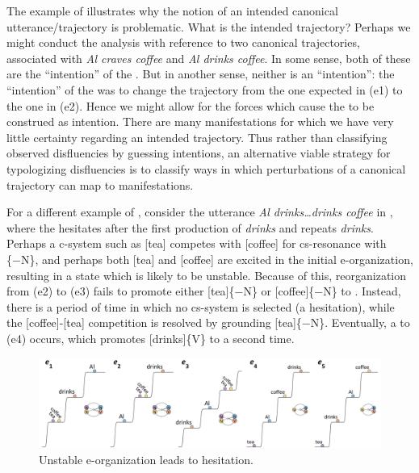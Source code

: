   The example of {} illustrates why the notion of an intended canonical utterance/trajectory is problematic. What is the intended trajectory? Perhaps we might conduct the analysis with reference to two canonical trajectories, associated with \textit{Al craves coffee} and \textit{Al drinks coffee}. In some sense, both of these are the “intention” of the . But in another sense, neither is an “intention”: the “intention” of the  was to change the trajectory from the one expected in (e1) to the one in (e2). Hence we might allow for the  forces which cause the  to be construed as intention. There are many  manifestations for which we have very little certainty regarding an intended trajectory. Thus rather than classifying observed disfluencies by guessing intentions, an alternative viable strategy for typologizing disfluencies is to classify ways in which perturbations of a canonical trajectory can map to manifestations.

  For a different example of , consider the utterance \textit{Al drinks…drinks coffee} in {}, where the  hesitates after the first production of \textit{drinks} and repeats \textit{drinks}. Perhaps a c-system such as [tea] competes with [coffee] for cs-resonance with \{−N\}, and perhaps both [tea] and [coffee] are excited in the initial e-organization, resulting in a state which is likely to be unstable. Because of this, reorganization from (e2) to (e3) fails to promote either [tea]\{−N\} or [coffee]\{−N\} to . Instead, there is a period of time in which no cs-system is selected (a hesitation), while the [coffee]-[tea] competition is resolved by grounding [tea]\{−N\}. Eventually, a  to (e4) occurs, which promotes [drinks]\{V\} to  a second time. 

  
\begin{figure}
\includegraphics[width=\textwidth]{figures/Tilsen-img61.png}
\caption{Unstable e-organization leads to hesitation.}
\label{fig:4:11}
\end{figure}
 

